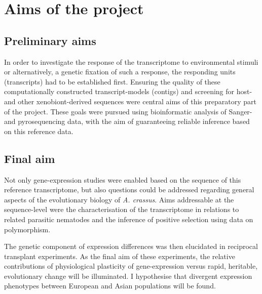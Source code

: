 
\chapter{Aims of the project} %



\section{Preliminary aims}

In order to investigate the response of the transcriptome to
environmental stimuli or alternatively, a genetic fixation of such a
response, the responding units (transcripts) had to be established
first. Ensuring the quality of these computationally constructed
transcript-models (contigs) and screening for host- and other
xenobiont-derived sequences were central aims of this preparatory part
of the project. These goals were pursued using bioinformatic analysis
of Sanger- and pyrosequencing data, with the aim of guaranteeing
reliable inference based on this reference data.

\section{Final aim}

Not only gene-expression studies were enabled based on the sequence of
this reference transcriptome, but also questions could be addressed
regarding general aspects of the evolutionary biology of
\textit{A. crassus}. Aims addressable at the sequence-level were the
characterisation of the transcriptome in relations to related
parasitic nematodes and the inference of positive selection using data
on polymorphism.

The genetic component of expression differences was then elucidated in
reciprocal transplant experiments. As the final aim of these
experiments, the relative contributions of physiological plasticity of
gene-expression versus rapid, heritable, evolutionary change will be
illuminated. I hypothesise that divergent expression phenotypes
between European and Asian populations will be found.



     